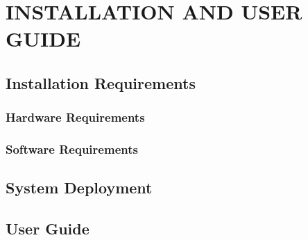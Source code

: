 \chapter{INSTALLATION AND USER GUIDE}\label{app:installation}

\section{Installation Requirements}
\subsection{Hardware Requirements}
\subsection{Software Requirements}

\section{System Deployment}

\section{User Guide}
